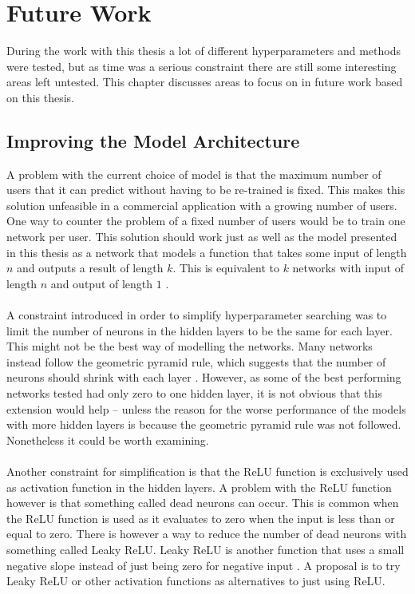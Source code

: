 \chapter{Future Work}\label{chap:future_work}
During the work with this thesis a lot of different hyperparameters and methods were tested, but as time was a serious constraint there are still some interesting areas left untested. This chapter discusses areas to focus on in future work based on this thesis.

\section{Improving the Model Architecture}\label{sec:improving_arch}
A problem with the current choice of model is that the maximum number of users that it can predict without having to be re-trained is fixed. This makes this solution unfeasible in a commercial application with a growing number of users. One way to counter the problem of a fixed number of users would be to train one network per user. This solution should work just as well as the model presented in this thesis as a network that models a function that takes some input of length $n$ and outputs a result of length $k$. This is equivalent to $k$ networks with input of length $n$ and output of length $1$ \parencite{leshno1993multilayer}.
\\\\
A constraint introduced in order to simplify hyperparameter searching was to limit the number of neurons in the hidden layers to be the same for each layer. This might not be the best way of modelling the networks. Many networks instead follow the geometric pyramid rule, which suggests that the number of neurons should shrink with each layer \parencite{masters1993practical}. However, as some of the best performing networks tested had only zero to one hidden layer, it is not obvious that this extension would help -- unless the reason for the worse performance of the models with more hidden layers is because the geometric pyramid rule was not followed. Nonetheless it could be worth examining.
\\\\
Another constraint for simplification is that the ReLU function is exclusively used as activation function in the hidden layers. A problem with the ReLU function however is that something called dead neurons can occur. This is common when the ReLU function is used as it evaluates to zero when the input is less than or equal to zero. There is however a way to reduce the number of dead neurons with something called Leaky ReLU. Leaky ReLU is another function that uses a small negative slope instead of just being zero for negative input \parencite{maas2013rectifier}. A proposal is to try Leaky ReLU or other activation functions as alternatives to just using ReLU.

